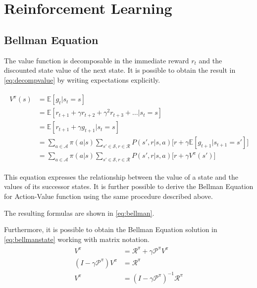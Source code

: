 \appendix

\chapter{Reinforcement Learning}

\section{Bellman Equation} \label{appendix:bellmaneq}


The value function is decomposable in the immediate reward $r_t$ and the discounted state value of the next state. It is possible to obtain the result in \vref{eq:decompvalue} by writing expectations explicitly.

\begin{align}\label{eq:decompvalue}
\begin{split}
V^\pi(s) &= \mathbb{E}[g_t | s_t = s] \\
&= \mathbb{E}[r_{t+1} + \gamma r_{t+2} + \gamma^2 r_{t+3} + \dots | s_t = s] \\
&= \mathbb{E}[r_{t+1} + \gamma g_{t+1} | s_t = s] \\
&= \sum_{a \in \mathcal{A}}\pi(a|s)\sum_{s' \in \mathcal{S}, r \in \mathcal{R}}P(s', r | s, a)\big[r + \gamma\mathbb{E}[g_{t+1}| s_{t+1} = s']\big]\\
&= \sum_{a \in \mathcal{A}}\pi(a|s)\sum_{s' \in \mathcal{S}, r \in \mathcal{R}}P(s', r | s, a)\big[r + \gamma V^\pi(s')\big]
\end{split}
\end{align}

This equation expresses the relationship between the value of a state and the values of its successor states. It is further possible to derive the Bellman Equation for Action-Value function using the same procedure described above.

The resulting formulas are shown in \vref{eq:bellman}.

Furthermore, it is possible to obtain the Bellman Equation solution in \vref{eq:bellmanstate} working with matrix notation.
\begin{align} \label{eq:bellmanstate}
\begin{split}
V^\pi &= \mathcal{R}^\pi + \gamma \mathcal{P}^\pi V^\pi \\
(I - \gamma\mathcal{P}^\pi)V^\pi &= \mathcal{R}^\pi \\
V^\pi &= (I - \gamma\mathcal{P}^\pi)^{-1}\mathcal{R}^\pi
\end{split}
\end{align}
\newpage

